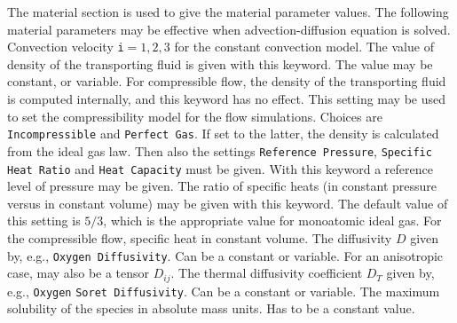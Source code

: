 The material section is used to give the material parameter values. The
following material parameters may be effective when advection-diffusion
equation is solved.
\sifbegin
{} 
Convection velocity {\tt i}$=1,2,3$ for the constant convection model.
The value of density of the transporting fluid 
is given with this keyword. The value may be constant,
or variable. For compressible flow, the density of the transporting fluid
is computed internally, and this keyword has no effect.
 This setting may be used to set the
compressibility
model for the flow simulations. Choices are {\tt Incompressible} and {\tt Perfect Gas}.
If set to the latter, the density is calculated from the ideal gas law.
Then also the settings {\tt Reference Pressure}, {\tt Specific Heat Ratio}
and {\tt Heat Capacity} must be given.
 With this keyword a reference level of pressure may be given.
 The ratio of specific heats (in constant pressure
versus in constant volume) may be given with this keyword.
The default value of this setting is $5/3$, which
is the appropriate value for monoatomic ideal gas.
 For the compressible flow, specific heat
in constant volume.
The diffusivity $D$ given by, e.g., {\tt Oxygen Diffusivity}. Can be a constant
or variable. For an anisotropic case, may also be a tensor $D_{ij}$.
The thermal diffusivity coefficient $D_T$ given by, e.g., {\tt Oxygen}
{\tt Soret Diffusivity}. 
Can be a constant or variable.
The maximum solubility of the species in absolute mass units. 
Has to be a constant value.
\sifend



